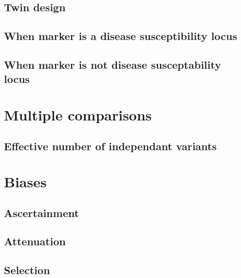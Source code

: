 \documentclass[
]{book}
\begin{document}
\hypertarget{twin-design}{%
\subsection{Twin design}\label{twin-design}}

\hypertarget{when-marker-is-a-disease-susceptibility-locus}{%
\subsection{When marker is a disease susceptibility locus}\label{when-marker-is-a-disease-susceptibility-locus}}

\hypertarget{when-marker-is-not-disease-susceptability-locus}{%
\subsection{When marker is not disease susceptability locus}\label{when-marker-is-not-disease-susceptability-locus}}

\hypertarget{multiple-comparisons}{%
\section{Multiple comparisons}\label{multiple-comparisons}}

\hypertarget{effective-number-of-independant-variants}{%
\subsection{Effective number of independant variants}\label{effective-number-of-independant-variants}}

\hypertarget{biases}{%
\section{Biases}\label{biases}}

\hypertarget{ascertainment}{%
\subsection{Ascertainment}\label{ascertainment}}

\hypertarget{attenuation}{%
\subsection{Attenuation}\label{attenuation}}

\hypertarget{selection}{%
\subsection{Selection}\label{selection}}
\end{document}

